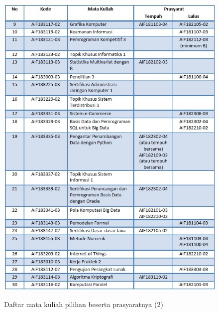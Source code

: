 \begin{figure}[H]
    \centering
    \includegraphics[width=12cm, height=16cm]{Gambar/Prasyarat MK Pilihan 2.jpg}
    \caption{Daftar mata kuliah pilihan beserta prasyaratnya (2)}
    \label{fig:gambar12}
\end{figure}

